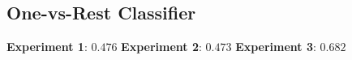 \documentclass{article}
\begin{document}
\subsection{One-vs-Rest Classifier}
\begin{itemize}
\textbf{Experiment 1}: $0.476$
\textbf{Experiment 2}: $0.473$
\textbf{Experiment 3}: $0.682$
\end{itemize}


%
%
%
%
%
%
%
%
%
\end{document}
